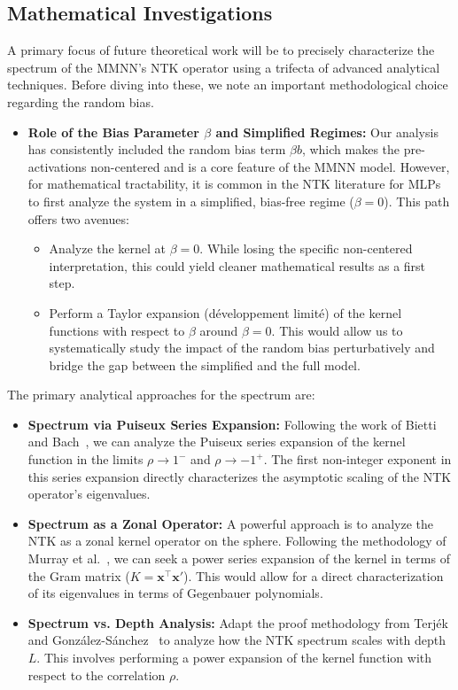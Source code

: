 \documentclass[a4paper]{article}
\begin{document}
\subsection{Mathematical Investigations}
A primary focus of future theoretical work will be to precisely characterize the spectrum of the MMNN's NTK operator using a trifecta of advanced analytical techniques. Before diving into these, we note an important methodological choice regarding the random bias.
\begin{itemize}
    \item \textbf{Role of the Bias Parameter $\beta$ and Simplified Regimes:} Our analysis has consistently included the random bias term $\beta b$, which makes the pre-activations non-centered and is a core feature of the MMNN model. However, for mathematical tractability, it is common in the NTK literature for MLPs to first analyze the system in a simplified, bias-free regime ($\beta=0$). This path offers two avenues:
        \begin{itemize}
            \item Analyze the kernel at $\beta=0$. While losing the specific non-centered interpretation, this could yield cleaner mathematical results as a first step.
            \item Perform a Taylor expansion (développement limité) of the kernel functions with respect to $\beta$ around $\beta=0$. This would allow us to systematically study the impact of the random bias perturbatively and bridge the gap between the simplified and the full model.
        \end{itemize}
\end{itemize}
The primary analytical approaches for the spectrum are:
\begin{itemize}
    \item \textbf{Spectrum via Puiseux Series Expansion:} Following the work of Bietti and Bach~\cite{bietti2021deepequalsshallowrelu}, we can analyze the Puiseux series expansion of the kernel function in the limits $\rho \to 1^-$ and $\rho \to -1^+$. The first non-integer exponent in this series expansion directly characterizes the asymptotic scaling of the NTK operator's eigenvalues.
    \item \textbf{Spectrum as a Zonal Operator:} A powerful approach is to analyze the NTK as a zonal kernel operator on the sphere. Following the methodology of Murray et al.~\cite{murray2023characterizingspectrumntkpower}, we can seek a power series expansion of the kernel in terms of the Gram matrix ($K = \bm{x}^\top\bm{x}'$). This would allow for a direct characterization of its eigenvalues in terms of Gegenbauer polynomials.
    \item \textbf{Spectrum vs. Depth Analysis:} Adapt the proof methodology from Terj\'{e}k and Gonz\'{a}lez-S\'{a}nchez~\cite{terjek2025mlpseocspectrumntk} to analyze how the NTK spectrum scales with depth $L$. This involves performing a power expansion of the kernel function with respect to the correlation $\rho$.
\end{itemize}
\end{document}
